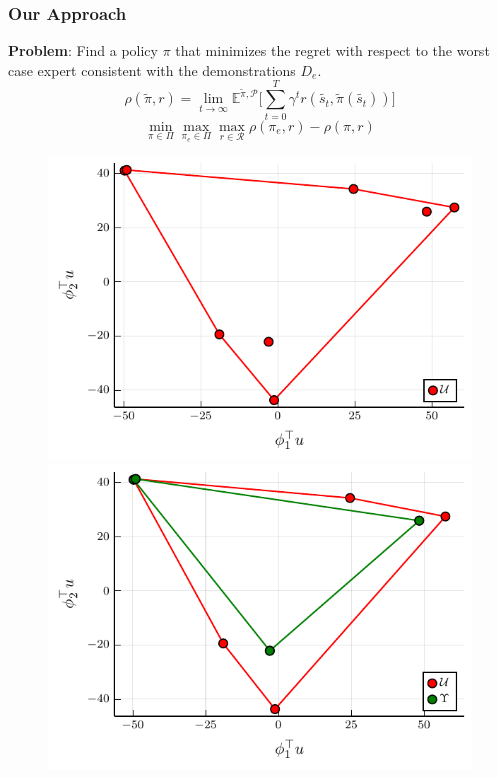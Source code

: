 \documentclass{beamer}
\begin{document}
\begin{frame}
	\frametitle{Our Approach}
	\textbf{Problem}: Find a policy $\pi$ that minimizes the regret with respect to the worst case expert consistent with the demonstrations $D_e$.
	\[ \rho(\tilde{\pi}, r) = \lim_{t \to \infty} \mathbb{E}^{\tilde{\pi}, \mathcal{P}} \lbrack \sum_{t=0}^T \gamma^t r(\tilde{s_t}, \tilde{\pi}(\tilde{s_t})) \rbrack \]
	\[ \min_{\pi \in \Pi} \max_{\pi_e \in \Pi} \max_{r \in \mathcal{R}} \rho(\pi_e, r) - \rho(\pi, r)\]
\end{frame}

\begin{frame}
\begin{figure}
  \begin{center}
  \begin{minipage}{0.45\linewidth}
    \centering
	\includegraphics[width=\textwidth]{../../pres_roil/plots/visual_U.pdf}

  \end{minipage}
  \hspace{0.05\linewidth}
  \begin{minipage}{0.45\linewidth}
    \centering
	\includegraphics[width=\textwidth]{../../pres_roil/plots/visual_U_and_Upsilon.pdf}


\end{minipage}
\end{center}
\end{figure}
\end{frame}
\end{document}
